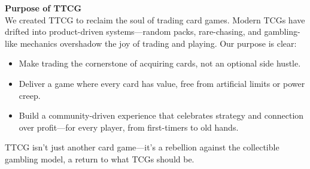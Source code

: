 \textbf{Purpose of TTCG} \\
We created TTCG to reclaim the soul of trading card games. Modern TCGs have drifted into product-driven systems—random packs, rare-chasing, and gambling-like mechanics overshadow the joy of trading and playing. Our purpose is clear:
\begin{itemize}
    \item Make trading the cornerstone of acquiring cards, not an optional side hustle.
    \item Deliver a game where every card has value, free from artificial limits or power creep.
    \item Build a community-driven experience that celebrates strategy and connection over profit—for every player, from first-timers to old hands.
\end{itemize}
TTCG isn’t just another card game—it’s a rebellion against the collectible gambling model, a return to what TCGs should be.

